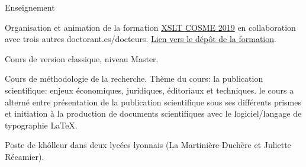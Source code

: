 










\begin{rubric}{Enseignement}
                                \entry*[2018-2019]
                                
                            Organisation et animation de la formation \href{https://cosme.hypotheses.org/1117}{XSLT COSME 2019} en
                        collaboration avec trois autres doctorant.es/docteurs. \href{https://github.com/gabays/Cours\_COSME\_2019}{Lien vers le dépôt de la
                        formation}.
                    
                                \entry*
                            Cours de version classique, niveau Master.
                    
                                \entry*
                            Cours de méthodologie de la recherche. Thème du cours: la publication
                        scientifique: enjeux économiques, juridiques, éditoriaux et techniques. le
                        cours a alterné entre présentation de la publication scientifique sous ses
                        différents prismes et initiation à la production de
                        documents scientifiques avec le logiciel/langage de typographie
                        LaTeX.
                    
                                \entry*[2017-2018]
                                
                            Poste de khôlleur dans deux lycées lyonnais (La Martinière-Duchère et
                        Juliette Récamier).
                    \end{rubric}


